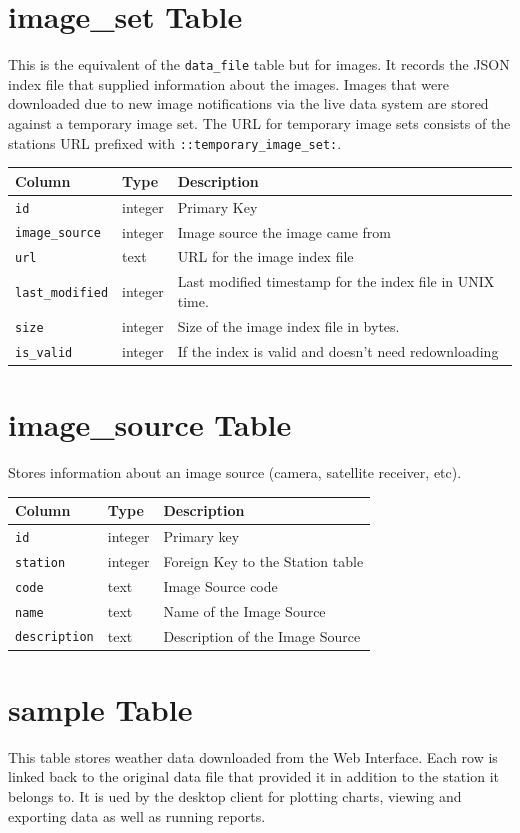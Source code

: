 \documentclass[a4paper,10pt]{book}
\begin{document}
\section{image\_set Table}
This is the equivalent of the \verb|data_file| table but for images. It records the JSON index file that supplied information about the images. Images that were downloaded due to new image notifications via the live data system are stored against a temporary image set. The URL for temporary image sets consists of the stations URL prefixed with \verb|::temporary_image_set:|.


\begin{tabular}{p{2.5cm} p{2.5cm} p{8.6cm}}
\hline
\textbf{Column} & \textbf{Type} & \textbf{Description} \\
\hline
\verb|id| & integer & Primary Key\\
\verb|image_source| & integer & Image source the image came from\\
\verb|url| & text & URL for the image index file\\
\verb|last_modified| & integer & Last modified timestamp for the index file in UNIX time.\\
\verb|size| & integer & Size of the image index file in bytes.\\
\verb|is_valid| & integer & If the index is valid and doesn't need redownloading\\
\hline
\end{tabular}

\section{image\_source Table}
Stores information about an image source (camera, satellite receiver, etc).

\begin{tabular}{p{2.5cm} p{2.5cm} l}
\hline
\textbf{Column} & \textbf{Type} & \textbf{Description} \\
\hline
\verb|id| & integer & Primary key\\
\verb|station| & integer & Foreign Key to the Station table\\
\verb|code| & text & Image Source code\\
\verb|name| & text & Name of the Image Source\\
\verb|description| & text & Description of the Image Source\\
\hline
\end{tabular}

\section{sample Table}
This table stores weather data downloaded from the Web Interface. Each row is linked back to the original data file that provided it in addition to the station it belongs to. It is ued by the desktop client for plotting charts, viewing and exporting data as well as running reports.
\end{document}
